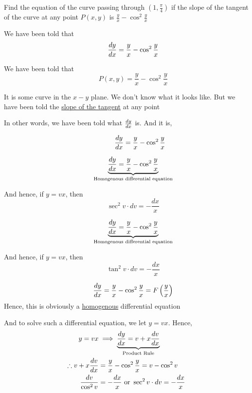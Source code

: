 \documentclass[14pt,fleqn]{extarticle}
\newcommand\pt{\left(1,\frac\pi{4} \right)}
\newcommand\yx{\frac{y}{x}}
\newcommand\dvdx{\frac{dv}{dx}}
\begin{document}
 
\begin{question}
	\statement 
    
    Find the equation of the curve passing through $\pt$ if the slope of the
    tangent of the curve at any point $P(x,y)$ is $\yx -\cos^2\yx$ 
    
    \begin{step}
  \begin{options} 
     \correct 
       
       We have been told that 
       \[ \qquad \dydx = \yx - \cos^2 \yx \]
     \incorrect
        
       We have been told that 
       \[ \qquad P(x,y) = \yx - \cos^2\yx \] 
    \end{options} 
     \reason 
     
     It is some curve in the $x-y$ plane. We don't know what it looks like. But we have been told the \underline{slope of the tangent} at any point\newline 
     
     In other words, we have been told what $\frac{dy}{dx}$ is. And it is, 
     
     \[ \qquad\qquad  \dydx = \yx - \cos^2\yx \]
       
\end{step}

\begin{step}
  \begin{options} 
     \correct 
      
      \[ \qquad \underbrace{\dydx = \yx - \cos^2\yx}_{\text{Homogenous differential equation}}\]
      
      And hence, if $ y = vx$, then 
      \[ \qquad \sec^2 v \cdot dv = -\frac{dx}{x} \]
     \incorrect
     
      \[ \qquad \underbrace{\dydx = \yx - \cos^2\yx}_{\text{Homogenous differential equation}}\]
      
      And hence, if $ y = vx$, then 
      \[ \qquad \tan^2 v \cdot dv = -\frac{dx}{x} \]
        
    \end{options} 
     \reason 
     
     \[ \qquad \dydx = \yx - \cos^2\yx = F \left(\yx \right)\]
     Hence, this is obviously a \underline{homogenous} differential equation \newline 
     
     And to solve such a differential equation, we let $y = vx$. Hence, 
     \begin{align}
     y = vx &\implies \underbrace{\dydx = v + x\dvdx}_{\text{Product Rule}} \\
     \therefore v + x\dvdx &= \yx - \cos^2\yx = v - \cos^2 v \\
     \frac{dv}{\cos^2 v} &= -\frac{dx}{x} \text{ or } \sec^2 v\cdot dv = -\frac{dx}{x}
\end{align}
       

\end{step}
\end{question}
\end{document}

